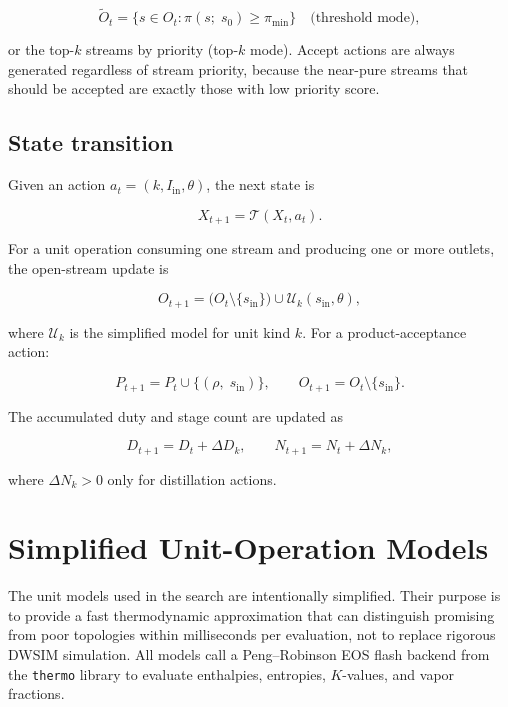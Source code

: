 \documentclass[11pt,a4paper]{article}
\theoremstyle{definition}
\theoremstyle{plain}
\newcommand{\calT}{\mathcal{T}}
\begin{document}
\begin{equation}
 \tilde{O}_t
 = \{s \in O_t : \pi(s;\; s_0) \geq \pi_{\min}\}
 \quad\text{(threshold mode)},
\end{equation}

or the top-$k$ streams by priority (top-$k$ mode). Accept actions are always generated regardless of stream priority, because the near-pure streams that should be accepted are exactly those with low priority score.

\subsection{State transition}

Given an action $a_t = (k, I_{\mathrm{in}}, \theta)$, the next state is

\begin{equation}
 X_{t+1} = \calT(X_t, a_t).
\end{equation}

For a unit operation consuming one stream and producing one or more outlets, the open-stream update is

\begin{equation}
 O_{t+1}
 = \bigl(O_t \setminus \{s_{\mathrm{in}}\}\bigr)
  \cup \mathcal{U}_k(s_{\mathrm{in}}, \theta),
\end{equation}

where $\mathcal{U}_k$ is the simplified model for unit kind $k$. For a product-acceptance action:

\begin{equation}
 P_{t+1} = P_t \cup \{(\rho,\; s_{\mathrm{in}})\},
 \qquad
 O_{t+1} = O_t \setminus \{s_{\mathrm{in}}\}.
\end{equation}

The accumulated duty and stage count are updated as

\begin{equation}
 D_{t+1} = D_t + \Delta D_k, \qquad
 N_{t+1} = N_t + \Delta N_k,
\end{equation}

where $\Delta N_k > 0$ only for distillation actions.

\section{Simplified Unit-Operation Models}
\label{sec:units}

The unit models used in the search are intentionally simplified. Their purpose is to provide a fast thermodynamic approximation that can distinguish promising from poor topologies within milliseconds per evaluation, not to replace rigorous DWSIM simulation. All models call a Peng--Robinson EOS flash backend from the \texttt{thermo} library to evaluate enthalpies, entropies, $K$-values, and vapor fractions.
\end{document}
